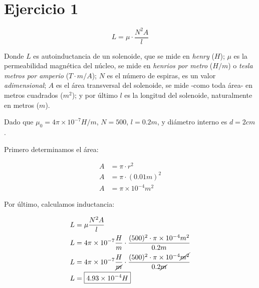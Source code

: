 \section{Ejercicio 1}

\begin{equation*}
    L = \mu \cdot \frac{N^{2}A}{l}
\end{equation*}

Donde \(L\) es autoinductancia de un solenoide,
que se mide en \textit{henry} (\(H\));
\(\mu\) es la permeabilidad magnética del núcleo,
se mide en \textit{henrios por metro} (\(H/m\)) 
o \textit{tesla metros por amperio} (\(T\cdot m/A\));
\(N\) es el número de espiras,
es un valor \textit{adimensional};
\(A\) es el área transversal del solenoide,
se mide -como toda área- en metros cuadrados (\(m^{2}\));
y por último \(l\) es la longitud del solenoide,
naturalmente en metros (\(m\)).

Dado que \(\mu_0 = 4\pi\times10^{-7} H/m\), \(N = 500\), \(l = 0.2 m\),
y diámetro interno es \(d = 2cm\).

Primero determinamos el área:

\begin{align*}
    A & = \pi\cdot r^{2} \\
    A & = \pi\cdot (0.01 m)^{2} \\
    A & = \boxed{\pi \times 10^{-4} m^{2}}
\end{align*}

Por último, calculamos inductancia:

\begin{align*}
    L & = \mu \frac{N^{2}A}{l} \\
    L & = 4\pi\times10^{-7} \frac{H}{m} \cdot \frac{(500)^{2} \cdot \pi \times 10^{-4} m^{2}}{0.2 m} \\
    L & = 4\pi\times10^{-7} \frac{H}{\cancel{m}} \cdot \frac{(500)^{2} \cdot \pi \times 10^{-4} \cancel{m^{2}}}{0.2 \cancel{m}} \\
    L & = \boxed{4.93\times10^{-4} H}
\end{align*}